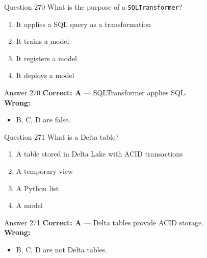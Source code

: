 \documentclass[aspectratio=169,11pt]{beamer}
\begin{document}
	\begin{frame}{Question 270}
		What is the purpose of a \texttt{SQLTransformer}?
		\begin{enumerate}[label=\Alph*.]
			\item It applies a SQL query as a transformation
			\item It trains a model
			\item It registers a model
			\item It deploys a model
		\end{enumerate}
	\end{frame}
	\begin{frame}{Answer 270}
		\textbf{Correct: A} --- SQLTransformer applies SQL.\\
		\vspace{0.5em}
		\textbf{Wrong:}
		\begin{itemize}
			\item B, C, D are false.
		\end{itemize}
	\end{frame}
	
	\begin{frame}{Question 271}
		What is a Delta table?
		\begin{enumerate}[label=\Alph*.]
			\item A table stored in Delta Lake with ACID transactions
			\item A temporary view
			\item A Python list
			\item A model
		\end{enumerate}
	\end{frame}
	\begin{frame}{Answer 271}
		\textbf{Correct: A} --- Delta tables provide ACID storage.\\
		\vspace{0.5em}
		\textbf{Wrong:}
		\begin{itemize}
			\item B, C, D are not Delta tables.
		\end{itemize}
	\end{frame}
	
\end{document}
